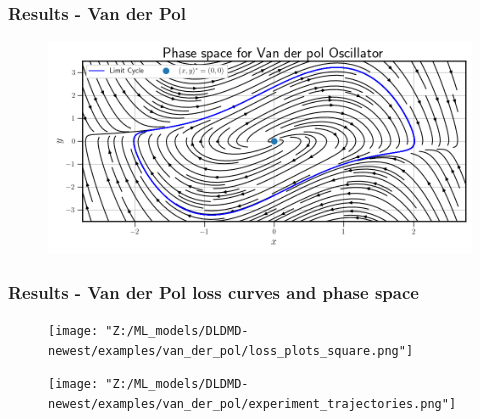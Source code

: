\documentclass[11pt,aspectratio=169]{beamer}
\begin{document}
    \begin{frame}
        \frametitle{Results - Van der Pol}
        \begin{figure}
            \centering
            \includegraphics[width=\textwidth]{../Figures/van_der_pol_phase_space.png}
        \end{figure}
    \end{frame}

    \begin{frame}
        \frametitle{Results - Van der Pol loss curves and phase space}
        \begin{figure}
            \centering
            \begin{minipage}{.5\textwidth}
                \texttt{[image: "Z:/ML\_models/DLDMD-newest/examples/van\_der\_pol/loss\_plots\_square.png"]}
            \end{minipage}%
            \begin{minipage}{.5\textwidth}
                \texttt{[image: "Z:/ML\_models/DLDMD-newest/examples/van\_der\_pol/experiment\_trajectories.png"]}
            \end{minipage}
        \end{figure}
    \end{frame}
\end{document}
